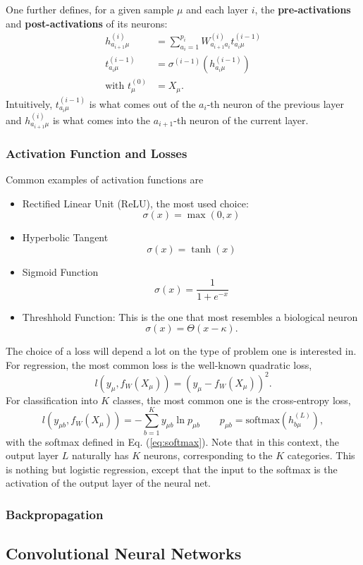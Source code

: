 \documentclass{article}
\begin{document}
One further defines, for a given sample $\mu$ and each layer $i$, the \textbf{pre-activations} and \textbf{post-activations} of its neurons:
\begin{align}
    h^{(i)}_{a_{i+1}\mu} &=
    \sum_{a_i=1}^{p_i} W^{(i)}_{a_{i+1}a_{i}} t^{(i-1)}_{a_{i}\mu} \\
    t^{(i-1)}_{a_{i}\mu} &=
    \sigma^{(i-1)}(h^{(i-1)}_{a_{i}\mu}) \\
    \text{with } t^{(0)}_{\mu} &= X_{\mu}.
\end{align}
Intuitively, $t^{(i-1)}_{a_{i}\mu}$ is what comes out of the $a_{i}$-th neuron of the previous layer and $h^{(i)}_{a_{i+1}\mu}$ is what comes into the $a_{i+1}$-th neuron of the current layer.

\subsubsection*{Activation Function and Losses}
Common examples of activation functions are
\begin{itemize}
    \item Rectified Linear Unit (ReLU), the most used choice:
    \begin{equation}
        \sigma(x) = \max(0,x)
    \end{equation}
    \item Hyperbolic Tangent
    \begin{equation}
        \sigma(x) = \tanh(x)
    \end{equation}
    \item Sigmoid Function
    \begin{equation}
        \sigma(x) = \frac{1}{1+e^{-x}}
    \end{equation}
    \item Threshhold Function: This is the one that most resembles a biological neuron
    \begin{equation}
        \sigma(x) = \Theta(x-\kappa).
    \end{equation}
\end{itemize}
The choice of a loss will depend a lot on the type of problem one is interested in. For regression, the most common loss is the well-known quadratic loss,
\begin{equation}
    l(y_{\mu}, f_W(X_{\mu}))
    =
    (y_{\mu} - f_W(X_{\mu}))^2.
\end{equation}
For classification into $K$ classes, the most common one is the cross-entropy loss,
\begin{equation}
    l(y_{\mu b}, f_W(X_{\mu}))
    =
    - \sum_{b=1}^{K}y_{\mu b} \ln{p_{\mu b}}
    \quad\quad
    p_{\mu b}
    =
    \text{softmax}\left(h^{(L)}_{b \mu}\right),
\end{equation}
with the softmax defined in Eq. (\ref{eq:softmax}). Note that in this context, the output layer $L$ naturally has $K$ neurons, corresponding to the $K$ categories. This is nothing but logistic regression, except that the input to the softmax is the activation of the output layer of the neural net.

\subsubsection*{Backpropagation}

\subsection{Convolutional Neural Networks}
\end{document}
